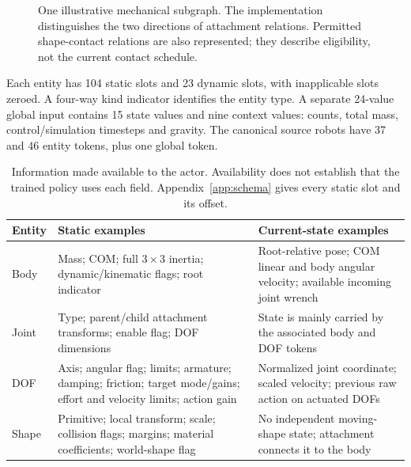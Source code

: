 \documentclass[11pt,letterpaper]{article}
\begin{document}
\begin{figure}[htbp]
\centering
{}
\caption{One illustrative mechanical subgraph. The implementation distinguishes
the two directions of attachment relations. Permitted shape-contact relations
are also represented; they describe eligibility, not the current contact schedule.}
\label{fig:graph}
\end{figure}

Each entity has 104 static slots and 23 dynamic slots, with inapplicable slots
zeroed. A four-way kind indicator identifies the entity type. A separate
24-value global input contains 15 state values and nine context values: counts,
total mass, control/simulation timesteps and gravity. The canonical source
robots have 37 and 46 entity tokens, plus one global token.

\begin{table}[htbp]
\centering\small
\begin{tabularx}{\linewidth}{@{}lYY@{}}
\toprule
Entity & Static examples & Current-state examples\\
\midrule
Body & Mass; COM; full $3\times3$ inertia; dynamic/kinematic flags; root indicator & Root-relative pose; COM linear and body angular velocity; available incoming joint wrench\\
Joint & Type; parent/child attachment transforms; enable flag; DOF dimensions & State is mainly carried by the associated body and DOF tokens\\
DOF & Axis; angular flag; limits; armature; damping; friction; target mode/gains; effort and velocity limits; action gain & Normalized joint coordinate; scaled velocity; previous raw action on actuated DOFs\\
Shape & Primitive; local transform; scale; collision flags; margins; material coefficients; world-shape flag & No independent moving-shape state; attachment connects it to the body\\
\bottomrule
\end{tabularx}
\caption{Information made available to the actor. Availability does not establish
that the trained policy uses each field. Appendix~\ref{app:schema} gives every
static slot and its offset.}
\end{table}
\end{document}
